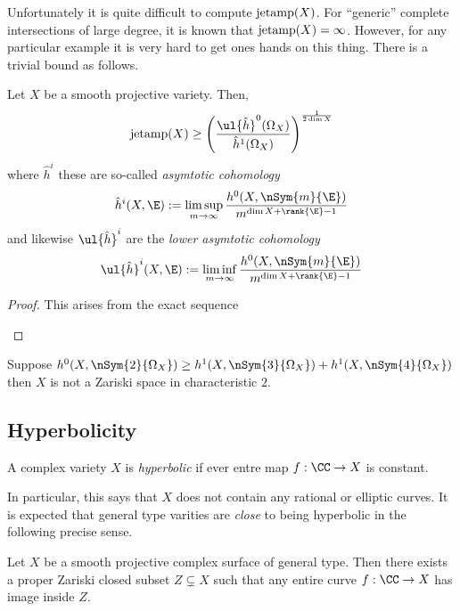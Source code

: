 \documentclass[12pt]{article}
\begin{document}
Unfortunately it is quite difficult to compute $\mathrm{jetamp}(X)$. For ``generic'' complete intersections of large degree, it is known that $\mathrm{jetamp}(X) = \infty$. However, for any particular example it is very hard to get ones hands on this thing. There is a trivial bound as follows.


\begin{prop}
Let $X$ be a smooth projective variety. Then,
\[ \jetamp(X) \ge \left(\frac{\ul{\hat{h}}^0(\Omega_X)}{\hat{h}^1(\Omega_X)}\right)^{\frac{1}{2 \dim{X}}} \]
where $\hat{h}^i$ these are so-called \textit{asymtotic cohomology}
\[ \hat{h}^i(X, \E) := \limsup_{m \to \infty} \frac{h^0(X, \nSym{m}{\E})}{m^{\dim{X} + \rank{\E} - 1}} \]
and likewise $\ul{\hat{h}}^i$ are the \textit{lower asymtotic cohomology}
\[ \ul{\hat{h}}^i(X, \E) := \liminf_{m \to \infty} \frac{h^0(X, \nSym{m}{\E})}{m^{\dim{X} + \rank{\E} - 1}} \]
\end{prop}


\begin{proof}
This arises from the exact sequence
\begin{center}
\end{center}
\end{proof}

\begin{example}
Suppose $h^0(X, \nSym{2}{\Omega_X}) \ge h^1(X, \nSym{3}{\Omega_X}) + h^1(X, \nSym{4}{\Omega_X})$ then $X$ is not a Zariski space in characteristic $2$.
\end{example}

\subsection{Hyperbolicity}

\begin{defn}
A complex variety $X$ is \textit{hyperbolic} if ever entre map $f : \CC \to X$ is constant.
\end{defn}

In particular, this says that $X$ does not contain any rational or elliptic curves. It is expected that general type varities are \textit{close} to being hyperbolic in the following precise sense.

\begin{conj}
Let $X$ be a smooth projective complex surface of general type. Then there exists a proper Zariski closed subset $Z \subsetneq X$ such that any entire curve $f : \CC \to X$ has image inside $Z$.
\end{conj}
\end{document}
